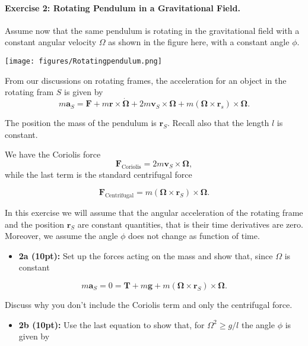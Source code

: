 \documentclass[%
oneside,                 %
final,                   %
10pt]{article}
\begin{document}
\noindent
\paragraph{Exercise 2: Rotating Pendulum in a Gravitational Field.}
Assume now that the same pendulum is rotating in the gravitational field with a constant angular velocity $\Omega$ as shown in the figure here, with a constant angle $\phi$.


\vspace{6mm}

\centerline{\texttt{[image: figures/Rotatingpendulum.png]}}

\vspace{6mm}



From our discussions on rotating frames, the acceleration for an object in the rotating fram $S$  is given by
\[
m\bm{a}_{S}=\bm{F}+m\bm{r}\times\dot{\bm{\Omega}}+2m\bm{v}_S\times\bm{\Omega}+m(\bm{\Omega}\times\bm{r}_s)\times\bm{\Omega}.
\]

The position the mass of the pendulum is $\bm{r}_S$. Recall also that the length $l$ is constant.

We have the Coriolis force
\[
\bm{F}_{\mathrm{Coriolis}}=2m\bm{v}_S\times\bm{\Omega},
\]
while the last term is the standard centrifugal force

\[
\bm{F}_{\mathrm{Centrifugal}}=m\left(\bm{\Omega}\times\bm{r}_S\right)\times\bm{\Omega}.
\]

In this exercise  we will assume that the angular acceleration of the rotating frame and the position $\bm{r}_S$ are  constant quantities, that is their time derivatives are zero. Moreover, we assume the angle $\phi$ does not change as function of time.

\begin{itemize}
\item \textbf{2a (10pt):} Set up the forces acting on the mass and show that, since $\Omega$ is constant
\end{itemize}

\noindent
\[
m\bm{a}_{S}=0=\bm{T}+m\bm{g}+m(\bm{\Omega}\times\bm{r}_S)\times\bm{\Omega}.
\]

Discuss why you don't include the Coriolis term and only the centrifugal force.


\begin{itemize}
\item \textbf{2b (10pt):} Use the last equation to show that, for $\Omega^2 \ge g/l$  the angle $\phi$ is given by
\end{itemize}
\end{document}
